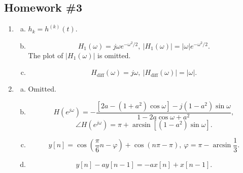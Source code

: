 \documentclass{article}
\begin{document}
    \subsection*{Homework \#3}
        \begin{enumerate}
            \item
            \begin{enumerate}[(a)]
                \item $h_k = h^{(k)}(t)$.
                \item \[
                    H_1(\omega) = j\omega e^{-\omega^2 / 2},\ 
                    \left\vert H_1(\omega) \right\vert = \left\vert \omega \right\vert  e^{-\omega^2 / 2}.
                \]
                The plot of $\left\vert H_1(\omega) \right\vert $ is omitted.
                \item \[
                    H_\text{diff} (\omega) = j\omega,\ 
                    \left\vert H_\text{diff} (\omega) \right\vert = \left\vert \omega \right\vert. 
                \]
            \end{enumerate}	
            
            \item 
            \begin{enumerate}[(a)]
                \item Omitted.
                \item \[
                    H(e^{j\omega}) = -\frac{[2a - (1 + a^2) \cos\omega] - j(1 - a^2)\sin\omega}{1 - 2a\cos\omega + a^2},
                \]
                \[
                    \angle H(e^{j\omega}) = \pi + \arcsin[(1-a^2) \sin \omega].
                \]
                \item \[
                    y[n] = \cos\left( \frac{\pi}{6}n - \varphi\right) + \cos(n\pi - \pi),\ 
                    \varphi = \pi - \arcsin \frac{1}{3}.
                \]
                \item \[
                    y[n] - ay[n-1] = -ax[n] + x[n - 1].
                \]
            \end{enumerate}
            

\end{enumerate}
\end{document}
